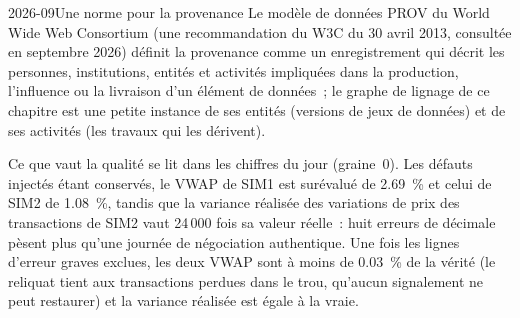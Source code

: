 \begin{omfigure}

\label{fig:pl:data-quality-and-lineage:lineage}
\end{omfigure}

\begin{dated}{2026-09}{Une norme pour la provenance}\label{dat:pl:data-quality-and-lineage:prov}
Le modèle de données PROV du World Wide Web Consortium (une recommandation du W3C du 30 avril 2013, consultée en septembre 2026) définit la provenance
comme un enregistrement qui décrit les personnes, institutions, entités et activités impliquées dans la production, l'influence ou la livraison
d'un élément de données~; le graphe de lignage de ce chapitre est une petite instance de ses entités (versions de jeux de données) et de ses activités (les travaux
qui les dérivent).
\end{dated}

Ce que vaut la qualité se lit dans les chiffres du jour (graine~0). Les défauts injectés étant conservés, le VWAP de SIM1 est surévalué de 2.69~\% et
celui de SIM2 de 1.08~\%, tandis que la variance réalisée des variations de prix des transactions de SIM2 vaut 24\,000 fois sa valeur réelle~: huit erreurs de décimale pèsent plus
qu'une journée de négociation authentique. Une fois les lignes d'erreur graves exclues, les deux VWAP sont à moins de 0.03~\% de la vérité (le reliquat tient aux transactions
perdues dans le trou, qu'aucun signalement ne peut restaurer) et la variance réalisée est égale à la vraie.

